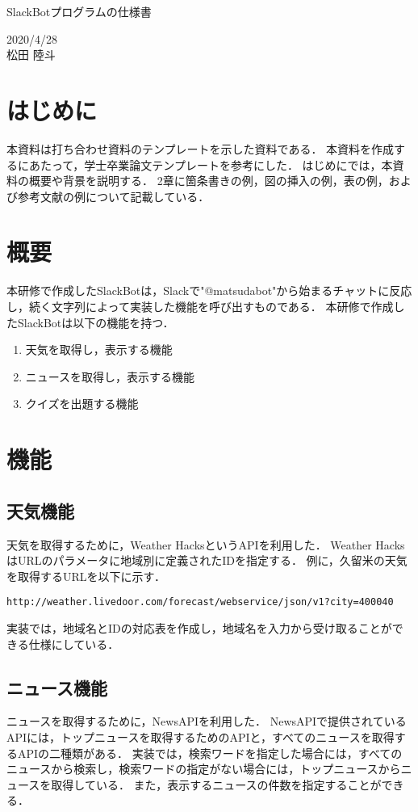 \documentclass[12pt]{jsarticle}
\begin{document}
\begin{center}
{\LARGE SlackBotプログラムの仕様書}
\end{center}

\begin{flushright}
  2020/4/28\\
  松田 陸斗
\end{flushright}
\section{はじめに}
\label{sec:introduction}
本資料は打ち合わせ資料のテンプレートを示した資料である．
本資料を作成するにあたって，学士卒業論文テンプレートを参考にした．
はじめにでは，本資料の概要や背景を説明する．
2章に箇条書きの例，図の挿入の例，表の例，および参考文献の例について記載している．

\section{概要}
本研修で作成したSlackBotは，Slackで"@matsudabot"から始まるチャットに反応し，続く文字列によって実装した機能を呼び出すものである．
本研修で作成したSlackBotは以下の機能を持つ．
\begin{enumerate}
\item 天気を取得し，表示する機能
\item ニュースを取得し，表示する機能
\item クイズを出題する機能
\end{enumerate}


\section{機能}
\subsection{天気機能}
天気を取得するために，Weather HacksというAPIを利用した．
Weather HacksはURLのパラメータに地域別に定義されたIDを指定する．
例に，久留米の天気を取得するURLを以下に示す．
\begin{verbatim}
http://weather.livedoor.com/forecast/webservice/json/v1?city=400040
\end{verbatim}
実装では，地域名とIDの対応表を作成し，地域名を入力から受け取ることができる仕様にしている．
\subsection{ニュース機能}
ニュースを取得するために，NewsAPIを利用した．
NewsAPIで提供されているAPIには，トップニュースを取得するためのAPIと，すべてのニュースを取得するAPIの二種類がある．
実装では，検索ワードを指定した場合には，すべてのニュースから検索し，検索ワードの指定がない場合には，トップニュースからニュースを取得している．
また，表示するニュースの件数を指定することができる．
\end{document}
